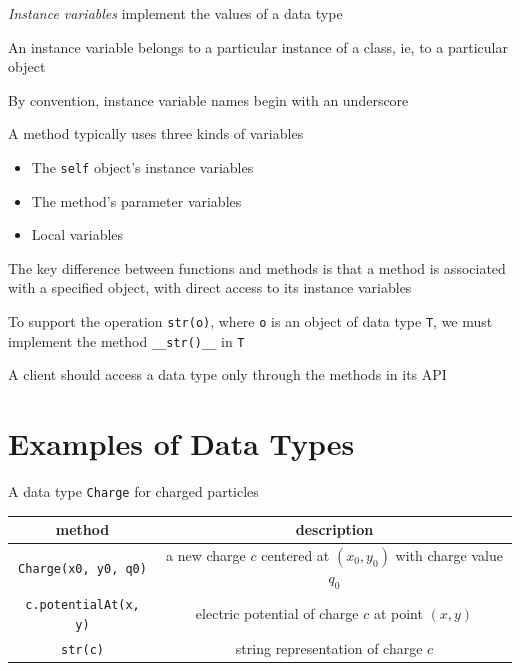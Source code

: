 \documentclass[8pt,a4paper,compress,handout]{beamer}
\begin{document}
\begin{frame}[fragile]
\emph{Instance variables} implement the values of a data type 

\bigskip

An instance variable belongs to a particular instance of a class, ie, to a particular object 

\bigskip

By convention, instance variable names begin with an underscore

\bigskip

A method typically uses three kinds of variables
\begin{itemize}
\item The \lstinline{self} object's instance variables

\item The method's parameter variables

\item Local variables
\end{itemize}

\bigskip

The key difference between functions and methods is that a method is associated with a specified object, with direct access to its instance variables

\bigskip

To support the operation \lstinline{str(o)}, where \lstinline{o} is an object of data type \lstinline{T}, we must implement the method \lstinline{__str()__} in \lstinline{T}

\bigskip

A client should access a data type only through the methods in its API
\end{frame}

\section{Examples of Data Types}

\begin{frame}[fragile]
A data type \lstinline{Charge} for charged particles
\begin{center}
\begin{tabular}{cc}
method & description \\ \hline
\lstinline$Charge(x0, y0, q0)$ & a new charge $c$ centered at $(x_0, y_0)$ with charge value $q_0$ \\
\lstinline$c.potentialAt(x, y)$ & electric potential of charge $c$ at point $(x, y)$ \\
\lstinline$str(c)$ & string representation of charge $c$
\end{tabular} 
\end{center}
\end{frame}
\end{document}
